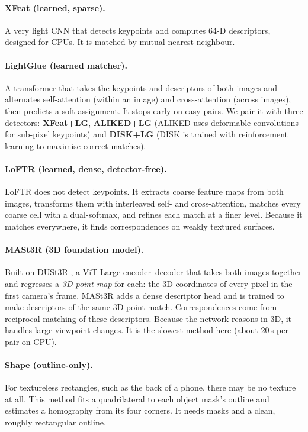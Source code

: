 \documentclass[11pt,a4paper]{article}
\begin{document}
\paragraph{XFeat \cite{xfeat} (learned, sparse).} A very light CNN that detects keypoints and
computes 64-D descriptors, designed for CPUs. It is matched by mutual nearest neighbour.

\paragraph{LightGlue \cite{lightglue} (learned matcher).} A transformer that takes the
keypoints and descriptors of both images and alternates self-attention (within an image) and
cross-attention (across images), then predicts a soft assignment. It stops early on easy pairs.
We pair it with three detectors: \textbf{XFeat+LG}, \textbf{ALIKED+LG} (ALIKED \cite{aliked}
uses deformable convolutions for sub-pixel keypoints) and \textbf{DISK+LG} (DISK \cite{disk} is
trained with reinforcement learning to maximise correct matches).

\paragraph{LoFTR \cite{loftr} (learned, dense, detector-free).} LoFTR does not detect keypoints.
It extracts coarse feature maps from both images, transforms them with interleaved self- and cross-attention,
matches every coarse cell with a dual-softmax, and refines each match at a finer level. Because it
matches everywhere, it finds correspondences on weakly textured surfaces.

\paragraph{MASt3R \cite{mast3r} (3D foundation model).} Built on DUSt3R \cite{dust3r}, a ViT-Large
encoder--decoder that takes both images together and regresses a \emph{3D point map} for each:
the 3D coordinates of every pixel in the first camera's frame. MASt3R adds a dense descriptor
head and is trained to make descriptors of the same 3D point match. Correspondences come from
reciprocal matching of these descriptors. Because the network reasons in 3D, it handles large
viewpoint changes. It is the slowest method here (about 20\,s per pair on CPU).

\paragraph{Shape (outline-only).} For textureless rectangles, such as the back of a phone, there may be
no texture at all. This method fits a quadrilateral to each object mask's outline and estimates
a homography from its four corners. It needs masks and a clean, roughly rectangular outline.
\end{document}
